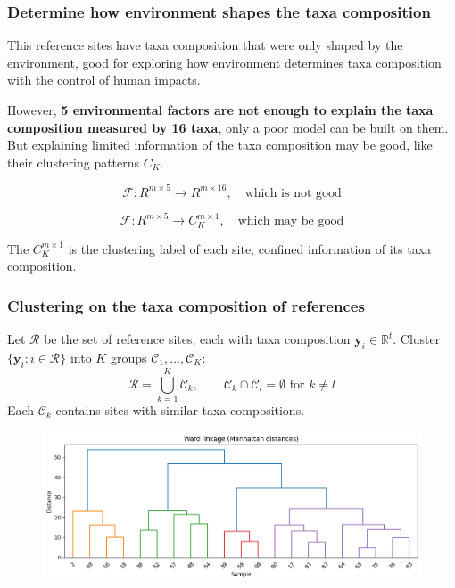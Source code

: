 \documentclass{beamer}
\begin{document}
\begin{frame}
\frametitle{Determine how environment shapes the taxa composition}

This reference sites have taxa composition that were only shaped by the environment, good 
for exploring how environment determines taxa composition with the control of human impacts.

However, \textbf{5 environmental factors are not enough to explain the taxa composition measured by 16 taxa},
only a poor model can be built on them. 
But explaining limited information of the taxa composition may be good,
like their clustering patterns \(C_K\).

\[
\mathcal{F}: R^{m \times 5} \to R^{m \times 16}, \quad \text{which is not good}
\]

\[
\mathcal{F}: R^{m \times 5} \to C_K^{m \times 1}, \quad \text{which may be good}
\]

The \(C_K^{m \times 1}\) is the clustering label of each site, confined information of its taxa composition.

\end{frame}

\begin{frame}
\frametitle{Clustering on the taxa composition of references}

\begin{center}
        \parbox{0.95\linewidth}{%
            Let $\mathcal{R}$ be the set of reference sites, each with taxa composition $\mathbf{y}_i \in \mathbb{R}^t$. Cluster $\{\mathbf{y}_i : i \in \mathcal{R}\}$ into $K$ groups $\mathcal{C}_1, \ldots, \mathcal{C}_K$:
            \[
            \mathcal{R} = \bigcup_{k=1}^K \mathcal{C}_k, \qquad \mathcal{C}_k \cap \mathcal{C}_l = \emptyset \text{ for } k \neq l
            \]
            Each $\mathcal{C}_k$ contains sites with similar taxa compositions.
        }
\end{center}

\begin{figure}
\centering
\includegraphics[width=\textwidth]{figures/p10_clustering_results.png}
\end{figure}

\end{frame}
\end{document}
